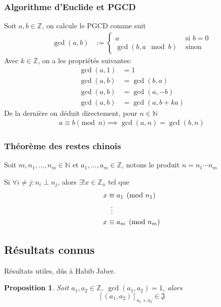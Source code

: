 \documentclass{article}
\newtheorem{proposition}{Proposition}
\begin{document}
\subsubsection{Algorithme d'Euclide et PGCD}

Soit $a, b \in \mathbb{Z}$, on calcule le PGCD comme suit
\begin{align*}
    \gcd(a, b) & := \begin{cases}
        a & \text{ si $b = 0$} \\
        \gcd(b, a \mod b) & \text{ sinon}
    \end{cases}
\end{align*}
Avec $k \in \mathbb{Z}$, on a les propriétés suivantes:
\begin{align*}
    \gcd(a, 1) & = 1 \\
    \gcd(a, b) & = \gcd(b, a) \\
    \gcd(a, b) &= \gcd(a, -b) \\
    \gcd(a, b) & = \gcd(a, b + ka)
\end{align*}
De la dernière on déduit directement, pour $n \in \mathbb{N}$
\begin{align*}
        a \equiv b \pmod n \implies \gcd(a, n) = \gcd(b, n)
\end{align*}

\subsubsection{Théorème des restes chinois}

Soit $m, n_1, \dots, n_m \in \mathbb{N}$ et $a_1, \dots, a_m \in \mathbb{Z}$, notons le produit $n = n_1 \cdots n_m$

Si $\forall i \neq j : n_i \perp n_j$, alors $\exists!x \in \mathbb{Z}_n$ tel que
\begin{align*}
    x &\equiv a_1 \pmod {n_1} \\
    &\vdotswithin{\equiv} \\
    x &\equiv a_m \pmod {n_m}
\end{align*}


\subsection{Résultats connus}
Résultats utiles, dûs à Habib Jaber.

\begin{proposition}
    Soit $a_1, a_2 \in \mathbb{Z},\; \gcd(a_1, a_2) = 1$, alors
    \[ {[(a_1, a_2)]}_{a_1+a_2} \in \mathfrak{J} \]
\end{proposition}
\end{document}
